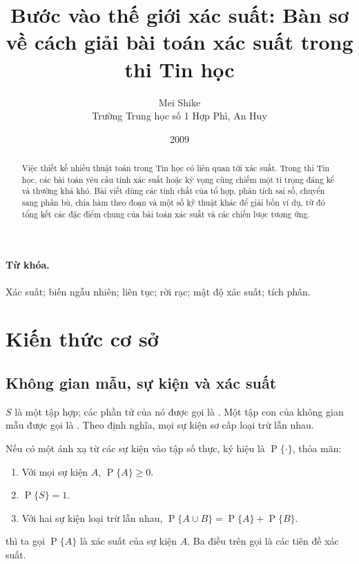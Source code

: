 \documentclass[11pt]{article}
\title{Bước vào thế giới xác suất: Bàn sơ về cách giải bài toán xác suất trong thi Tin học}
\author{Mei Shike\\Trường Trung học số 1 Hợp Phì, An Huy}
\date{2009}
\newcommand{\Prob}{\operatorname{P}}
\begin{document}
\maketitle


\begin{abstract}
Việc thiết kế nhiều thuật toán trong Tin học có liên quan tới xác suất. Trong
thi Tin học, các bài toán yêu cầu tính xác suất hoặc kỳ vọng cũng chiếm một
tỉ trọng đáng kể và thường khá khó. Bài viết dùng các tính chất của tổ hợp,
phân tích sai số, chuyển sang phần bù, chia hàm theo đoạn và một số kỹ thuật
khác để giải bốn ví dụ, từ đó tổng kết các đặc điểm chung của bài toán xác
suất và các chiến lược tương ứng.
\end{abstract}

\paragraph{Từ khóa.}
Xác suất; biến ngẫu nhiên; liên tục; rời rạc; mật độ xác suất; tích phân.

\section{Kiến thức cơ sở}

\subsection{Không gian mẫu, sự kiện và xác suất}

 \(S\) là một tập hợp; các phần tử của nó được gọi là
. Một tập con của không gian mẫu được gọi là
. Theo định nghĩa, mọi sự kiện sơ cấp loại trừ lẫn nhau.

Nếu có một ánh xạ từ các sự kiện vào tập số thực, ký hiệu là \(\Prob\{\cdot\}\),
thỏa mãn:
\begin{enumerate}
  \item Với mọi sự kiện \(A\), \(\Prob\{A\}\ge 0\).
  \item \(\Prob\{S\}=1\).
  \item Với hai sự kiện loại trừ lẫn nhau, \(\Prob\{A\cup B\}=\Prob\{A\}+\Prob\{B\}\).
\end{enumerate}
thì ta gọi \(\Prob\{A\}\) là xác suất của sự kiện \(A\). Ba điều trên gọi là
các tiên đề xác suất.
\end{document}
